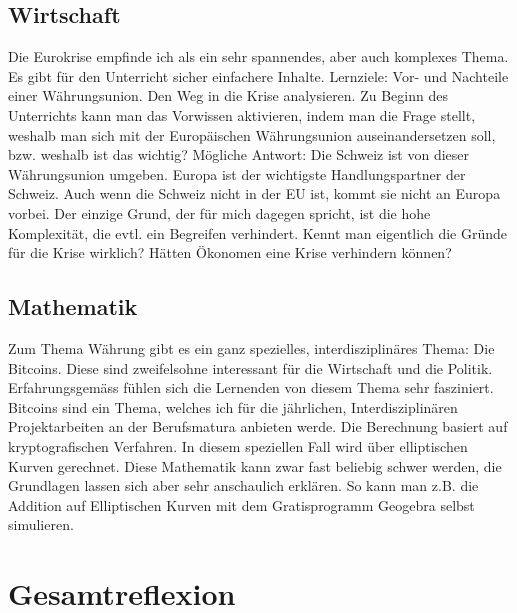 \documentclass[11pt, twocolumn, a4paper]{scrartcl}
\begin{document}
\subsection{Wirtschaft}
Die Eurokrise empfinde ich als ein sehr spannendes, aber auch komplexes Thema. Es gibt für den Unterricht sicher einfachere Inhalte.
Lernziele: Vor- und Nachteile einer Währungsunion. Den Weg in die Krise analysieren. Zu Beginn des Unterrichts kann man das Vorwissen aktivieren, indem man die Frage stellt, weshalb man sich mit der Europäischen Währungsunion auseinandersetzen soll, bzw. weshalb ist das wichtig? Mögliche Antwort: Die Schweiz ist von dieser Währungsunion umgeben. Europa ist der wichtigste Handlungspartner der Schweiz. Auch wenn die Schweiz nicht in der EU ist, kommt sie nicht an Europa vorbei. Der einzige Grund, der für mich dagegen spricht, ist die hohe Komplexität, die evtl. ein Begreifen verhindert. Kennt man eigentlich die Gründe für die Krise wirklich? Hätten Ökonomen eine Krise verhindern können?
\subsection{Mathematik}
Zum Thema Währung gibt es ein ganz spezielles, interdisziplinäres Thema: Die Bitcoins. Diese sind zweifelsohne interessant für die Wirtschaft und die Politik. Erfahrungsgemäss fühlen sich die Lernenden von diesem Thema sehr fasziniert. Bitcoins sind ein Thema, welches ich  für die jährlichen, Interdisziplinären Projektarbeiten an der Berufsmatura anbieten werde. Die Berechnung basiert auf kryptografischen Verfahren. In diesem speziellen Fall wird über elliptischen Kurven gerechnet. Diese Mathematik kann zwar fast beliebig schwer werden, die Grundlagen lassen sich aber sehr anschaulich erklären. So kann man z.B. die Addition auf Elliptischen Kurven mit dem Gratisprogramm Geogebra selbst simulieren.

\section{Gesamtreflexion}
\end{document}
